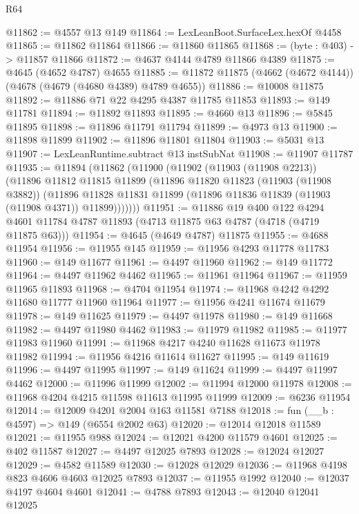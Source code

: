 \begin{lexlean}{R64}
\begin{coremodule}
@11862 := @4557 @13 @149
@11864 := LexLeanBoot.SurfaceLex.hexOf @4458
@11865 := @11862 @11864
@11866 := @11860 @11865
@11868 := (byte : @403) -> @11857 @11866
@11872 := @4637 @4144 @4789 @11866 @4389
@11875 := @4645 (@4652 @4787) @4655
@11885 := @11872 @11875 (@4662 (@4672 @4144)) (@4678 (@4679 (@4680 @4389) @4789 @4655))
@11886 := @10008 @11875
@11892 := @11886 @71 @22 @4295 @4387 @11785 @11853
@11893 := @149 @11781
@11894 := @11892 @11893
@11895 := @4660 @13
@11896 := @5845 @11895
@11898 := @11896 @11791 @11794
@11899 := @4973 @13
@11900 := @11898 @11899
@11902 := @11896 @11801 @11804
@11903 := @5031 @13
@11907 := LexLeanRuntime.subtract @13 instSubNat
@11908 := @11907 @11787
@11935 := @11894
    (@11862
      (@11900
        (@11902
          (@11903 (@11908 @2213))
          (@11896
            @11812
            @11815
            @11899
            (@11896
              @11820
              @11823
              (@11903 (@11908 @3882))
              (@11896
                @11828
                @11831
                @11899
                (@11896 @11836 @11839 (@11903 (@11908 @4371)) @11899)))))))
@11951 := @11886
    @19
    @400
    @122
    @4294
    @4601
    @11784
    @4787
    @11893
    (@4713 @11875 @63 @4787 (@4718 (@4719 @11875 @63)))
@11954 := @4645 (@4649 @4787) @11875
@11955 := @4688 @11954
@11956 := @11955 @145
@11959 := @11956 @4293 @11778 @11783
@11960 := @149 @11677
@11961 := @4497 @11960
@11962 := @149 @11772
@11964 := @4497 @11962 @4462
@11965 := @11961 @11964
@11967 := @11959 @11965 @11893
@11968 := @4704 @11954
@11974 := @11968 @4242 @4292 @11680 @11777 @11960 @11964
@11977 := @11956 @4241 @11674 @11679
@11978 := @149 @11625
@11979 := @4497 @11978
@11980 := @149 @11668
@11982 := @4497 @11980 @4462
@11983 := @11979 @11982
@11985 := @11977 @11983 @11960
@11991 := @11968 @4217 @4240 @11628 @11673 @11978 @11982
@11994 := @11956 @4216 @11614 @11627
@11995 := @149 @11619
@11996 := @4497 @11995
@11997 := @149 @11624
@11999 := @4497 @11997 @4462
@12000 := @11996 @11999
@12002 := @11994 @12000 @11978
@12008 := @11968 @4204 @4215 @11598 @11613 @11995 @11999
@12009 := @6236 @11954
@12014 := @12009 @4201 @2004 @163 @11581 @7188
@12018 := fun (__b : @4597) => @149 (@6554 @2002 @63)
@12020 := @12014 @12018 @11589
@12021 := @11955 @988
@12024 := @12021 @4200 @11579 @4601
@12025 := @402 @11587
@12027 := @4497 @12025 @7893
@12028 := @12024 @12027
@12029 := @4582 @11589
@12030 := @12028 @12029
@12036 := @11968 @4198 @823 @4606 @4603 @12025 @7893
@12037 := @11955 @1992
@12040 := @12037 @4197 @4604 @4601
@12041 := @4788 @7893
@12043 := @12040 @12041 @12025

\end{coremodule}
\end{lexlean}
